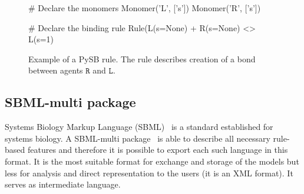 \documentclass[12pt]{fithesis2}
\begin{document}
\begin{figure}[!h]
\begin{center}
\begin{python}
# Declare the monomers
Monomer('L', ['s'])
Monomer('R', ['s'])

# Declare the binding rule
Rule(L(s=None) + R(s=None) <> L(s=1) %
\end{python}
\end{center}
\caption{Example of a PySB rule. The rule describes creation of a bond between agents $\mathtt{R}$ and $\mathtt{L}$.}\label{PySB-rule}\label{pysb_rule}
\end{figure}

\subsection{SBML-multi package}

Systems Biology Markup Language (SBML)~\cite{hucka2003systems} is a standard established for systems biology. A SBML-multi package~\cite{zhang2015sbml} is able to describe all necessary rule-based features and therefore it is possible to export each such language in this format. It is the most suitable format for exchange and storage of the models but less for analysis and direct representation to the users (it is an XML format). It serves as intermediate language.
\end{document}
